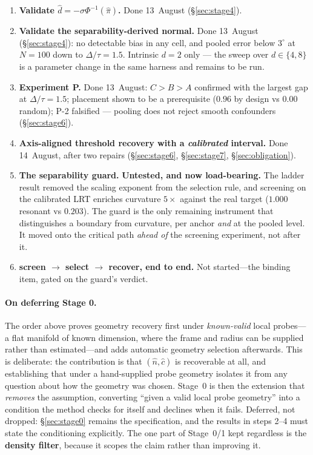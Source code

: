 \documentclass[11pt]{article}
\newcommand{\dhat}{\hat{d}}
\newcommand{\pihat}{\hat{\pi}}
\newcommand{\nhat}{\hat{n}}
\newcommand{\chat}{\hat{c}}
\begin{document}
\begin{enumerate}
\item \textbf{Validate $\dhat = -\sigma\Phi^{-1}(\pihat)$.} \textcolor{okgreen}{Done 13~August}
(\S\ref{sec:stage4}).
\item \textbf{Validate the separability-derived normal.} \textcolor{okgreen}{Done 13~August}
(\S\ref{sec:stage4}): no detectable bias in any cell, and pooled error below $3^\circ$ at
$N = 100$ down to $\Delta/\tau = 1.5$. Intrinsic $d = 2$ only --- the sweep over
$d \in \{4, 8\}$ is a parameter change in the same harness and remains to be run.
\item \textbf{Experiment P.} \textcolor{okgreen}{Done 13~August}: $C > B > A$ confirmed with
the largest gap at $\Delta/\tau = 1.5$; placement shown to be a prerequisite ($0.96$ by design
vs $0.00$ random); P-2 falsified --- pooling does not reject smooth confounders
(\S\ref{sec:stage6}).
\item \textbf{Axis-aligned threshold recovery with a \emph{calibrated} interval.}
\textcolor{okgreen}{Done 14~August, after two repairs} (\S\ref{sec:stage6},
\S\ref{sec:stage7}, \S\ref{sec:obligation}).
\item \textbf{The separability guard.} \textcolor{limred}{\textbf{Untested, and now
load-bearing.}} The ladder result removed the scaling exponent from the selection rule, and
screening on the calibrated LRT enriches curvature $5\times$ against the real target ($1.000$
resonant vs $0.203$). The guard is the only remaining instrument that distinguishes a boundary
from curvature, per anchor \emph{and} at the pooled level. It moved onto the critical path
\emph{ahead of} the screening experiment, not after it.
\item \textbf{screen $\to$ select $\to$ recover, end to end.} \textcolor{limred}{Not
started}---the binding item, gated on the guard's verdict.
\end{enumerate}

\paragraph{On deferring Stage 0.} The order above proves geometry recovery first under
\emph{known-valid} local probes---a flat manifold of known dimension, where the frame and radius
can be supplied rather than estimated---and adds automatic geometry selection afterwards. This is
deliberate: the contribution is that $(\nhat,\chat)$ is recoverable at all, and establishing that
under a hand-supplied probe geometry isolates it from any question about how the geometry was
chosen. Stage~0 is then the extension that \emph{removes} the assumption, converting ``given a
valid local probe geometry'' into a condition the method checks for itself and declines when it
fails. Deferred, not dropped: \S\ref{sec:stage0} remains the specification, and the results in
steps 2--4 must state the conditioning explicitly. The one part of Stage~0/1 kept regardless is
the \textbf{density filter}, because it scopes the claim rather than improving it.
\end{document}
